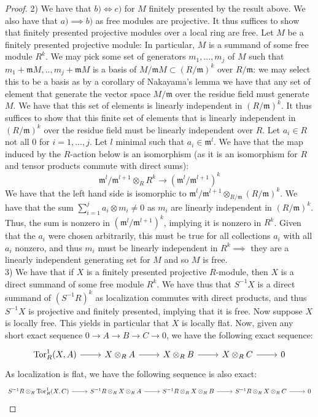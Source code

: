 \documentclass{article}
\newcommand{\fk}[1]{\mathfrak{#1}}
\begin{document}
\begin{proof}
2) We have that $b) \iff c)$ for $M$ finitely presented by the result above. We also have that $a) \implies b)$ as free modules are projective. It thus suffices to show that finitely presented projective modules over a local ring are free. Let $M$ be a finitely presented projective module: In particular, $M$ is a summand of some free module $R^{k}$. We may pick some set of generators $m_{1},...,m_{j}$ of $M$ such that $m_{1}+\fk{m}M,..,m_{j}+\fk{m}M$ is a basis of $M/\fk{m}M\subset (R/\fk{m})^{k}$ over $R/\fk{m}$: we may select this to be a basis as by a corollary of Nakayama's lemma we have that any set of element that generate the vector space $M/\fk{m}$ over the residue field must generate $M$. We have that this set of elements is linearly independent in $(R/\fk{m})^{k}$. It thus suffices to show that this finite set of elements that is linearly independent in $(R/\fk{m})^{k}$ over the residue field must be linearly independent over $R$. Let $a_{i} \in R$ not all $0$ for $i = 1,...,j$. Let $l$ minimal such that $a_{i} \in \fk{m}^{l}$. We have that the map induced by the $R$-action below is an isomorphism (as it is an isomorphism for $R$ and tensor products commute with direct sums):
\[
  \fk{m}^{l}/\fk{m}^{l+1} \otimes_{R} R^{k} \to (\fk{m}^{l}/\fk{m}^{l+1})^{k}
\]
We have that the left hand side is isomorphic to $\fk{m}^{l}/\fk{m}^{l+1} \otimes_{R/\fk{m}}(R/\fk{m})^{k}$. We have that the sum $\sum _{i=1}^{j}a_{i} \otimes m_{i} \neq 0$ as $m_{i}$ are linearly independent in $(R/\fk{m})^{k}$. Thus, the sum is nonzero in $(\fk{m}^{l}/\fk{m}^{l+1})^{k}$, implying it is nonzero in $R^{k}$. Given that the $a_{i}$ were chosen arbitrarily, this must be true for all collections $a_{i}$ with all $a_{i}$ nonzero, and thus $m_{i}$ must be linearly independent in $R^{k} \implies $ they are a linearly independent generating set for $M$ and so $M$ is free. \\

3) We have that if $X$ is a finitely presented projective $R$-module, then $X$ is a direct summand of some free module $R^{k}$. We have thus that $S^{-1}X$ is a direct summand of $(S^{-1}R)^{k}$ as localization commutes with direct products, and thus $S^{-1}X$ is projective and finitely presented, implying that it is free. Now suppose $X$ is locally free. This yields in particular that $X$ is locally flat. Now, given any short exact sequence $0 \to A \to B \to C \to 0$, we have the following exact sequence:
\[
    \begin{tikzcd}
    \text{Tor}_{R}^{1}(X,A) \arrow[r] & X \otimes_{R} A \arrow[r] & X \otimes_{R} B \arrow[r] & X \otimes_{R} C \arrow[r] & 0   
  \end{tikzcd}
\]
As localization is flat, we have the following sequence is also exact:
\[
      \begin{tikzcd}
    S^{-1}R \otimes_{R} \text{Tor}_{R}^{1}(X,C) \arrow[r] & S^{-1}R \otimes_{R }X \otimes_{R} A \arrow[r] & S^{-1}R \otimes_{R} X \otimes_{R} B \arrow[r] & S^{-1}R \otimes_{R} X \otimes_{R} C \arrow[r] & 0   
  \end{tikzcd}
\]


\end{proof}
\end{document}
